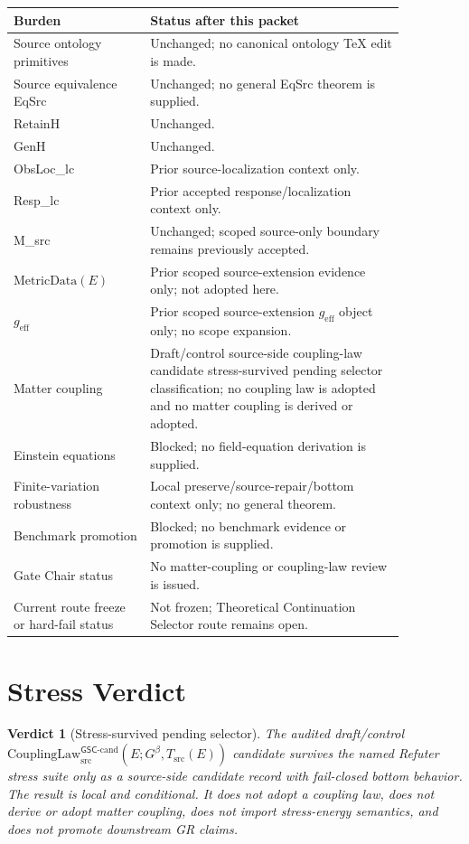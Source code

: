\documentclass[11pt]{article}
\newcommand{\Gbeta}{G^\beta}
\newcommand{\geff}{g_{\mathrm{eff}}}
\newcommand{\CouplingLaw}{\mathrm{CouplingLaw}^{\mathsf{GSC}\mbox{-}\mathrm{cand}}_{\mathrm{src}}}
\newcommand{\MetricData}{\mathrm{MetricData}}
\newtheorem{verdict}{Verdict}
\begin{document}
\begin{longtable}{p{0.30\linewidth}p{0.56\linewidth}}
\toprule
Burden & Status after this packet \\
\midrule
Source ontology primitives & Unchanged; no canonical ontology TeX edit is made. \\
Source equivalence EqSrc & Unchanged; no general EqSrc theorem is supplied. \\
RetainH & Unchanged. \\
GenH & Unchanged. \\
ObsLoc\_lc & Prior source-localization context only. \\
Resp\_lc & Prior accepted response/localization context only. \\
M\_src & Unchanged; scoped source-only boundary remains previously accepted. \\
\(\MetricData(E)\) & Prior scoped source-extension evidence only; not adopted here. \\
\(\geff\) & Prior scoped source-extension \(\geff\) object only; no scope expansion. \\
Matter coupling & Draft/control source-side coupling-law candidate stress-survived pending selector classification; no coupling law is adopted and no matter coupling is derived or adopted. \\
Einstein equations & Blocked; no field-equation derivation is supplied. \\
Finite-variation robustness & Local preserve/source-repair/bottom context only; no general theorem. \\
Benchmark promotion & Blocked; no benchmark evidence or promotion is supplied. \\
Gate Chair status & No matter-coupling or coupling-law review is issued. \\
Current route freeze or hard-fail status & Not frozen; Theoretical Continuation Selector route remains open. \\
\bottomrule
\end{longtable}

\section{Stress Verdict}

\begin{verdict}[Stress-survived pending selector]
The audited draft/control
\(\CouplingLaw(E;\Gbeta,T_{\mathrm{src}}(E))\) candidate survives the named
Refuter stress suite only as a source-side candidate record with fail-closed
bottom behavior. The result is local and conditional. It does not adopt a
coupling law, does not derive or adopt matter coupling, does not import
stress-energy semantics, and does not promote downstream GR claims.
\end{verdict}
\end{document}

